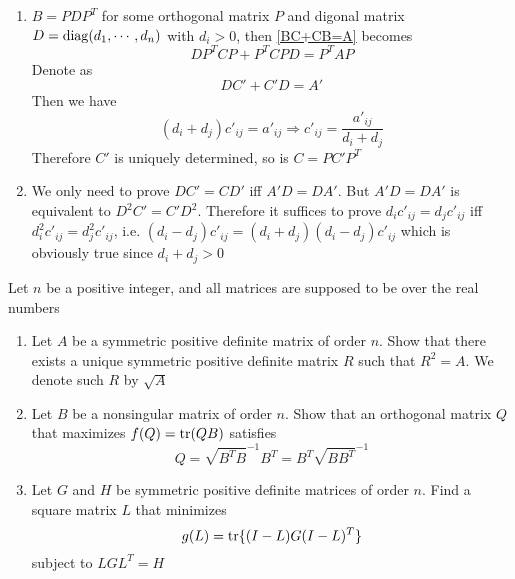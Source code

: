 \documentclass[main]{subfiles}
\begin{document}
\begin{solution}
\begin{enumerate}[leftmargin=*,label=\textbf{\arabic*.}]
\item $B=PDP^T$ for some orthogonal matrix $P$ and digonal matrix $D=\operatorname{diag}(d_1,\cdots,d_n)$ with $d_i>0$, then \eqref{BC+CB=A} becomes
\[DP^TCP+P^TCPD=P^TAP\]
Denote as
\[DC'+C'D=A'\]
Then we have
\[(d_i+d_j)c'_{ij}=a'_{ij}\Rightarrow c'_{ij}=\dfrac{a'_{ij}}{d_i+d_j}\]
Therefore $C'$ is uniquely determined, so is $C=PC'P^T$
\item We only need to prove $DC'=CD'$ iff $A'D=DA'$. But $A'D=DA'$ is equivalent to $D^2C'=C'D^2$. Therefore it suffices to prove $d_ic'_{ij}=d_jc'_{ij}$ iff $d_i^2c'_{ij}=d_j^2c'_{ij}$, i.e. $(d_i-d_j)c'_{ij}=(d_i+d_j)(d_i-d_j)c'_{ij}$ which is obviously true since $d_i+d_j>0$
\end{enumerate}
\end{solution}

\begin{exercise}
Let $n$ be a positive integer, and all matrices are supposed to be over the real numbers
\begin{enumerate}[leftmargin=*,label=\textbf{\arabic*.}]
\item Let $A$ be a symmetric positive definite matrix of order $n$. Show that there exists a unique symmetric positive definite matrix $R$ such that $R^2=A$. We denote such $R$ by $\sqrt{A}$
\item Let $B$ be a nonsingular matrix of order $n$. Show that an orthogonal matrix $Q$ that maximizes $f(Q)=\operatorname{tr}(QB)$ satisfies
\[Q=\sqrt{B^TB}^{-1}B^T=B^T\sqrt{BB^T}^{-1}\]
\item Let $G$ and $H$ be symmetric positive definite matrices of order $n$. Find a square matrix $L$ that minimizes
\[g(L)=\operatorname{tr}\{(I-L)G(I-L)^T\}\]
subject to $LGL^T=H$
\end{enumerate}
\end{exercise}
\end{document}
